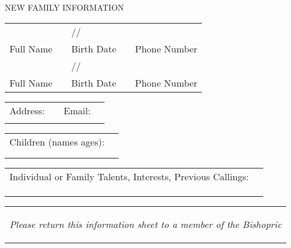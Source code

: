 \documentclass[11pt,twocolumn]{memoir}
\renewcommand\&{{\textnormal{\fontspec{Minion Pro}\itshape\amp}}}
\begin{document}
\thispagestyle{empty}

{\noindent\large\MakeUppercase{New Family Information}}

\renewcommand{\tabcolsep}{0in}
\noindent\begin{tabular}{>{\footnotesize}p{2in} p{0.1in} >{\footnotesize}p{1in} p{0.1in} >{\footnotesize}p{1.3in}}
    & & \hspace{2.5em}/\hspace{2.25em}/\\
    \hhline{-~-~-}
    Full Name & & Birth Date & & Phone Number\\
    & & \hspace{2.5em}/\hspace{2.25em}/\\
    \hhline{-~-~-}
    Full Name & & Birth Date & & Phone Number\\
\end{tabular}
\vspace{0.1em}
\begin{tabular}{>{\footnotesize}p{0.45in} >{\footnotesize}p{2.05in} >{\footnotesize}p{0.35in} >{\footnotesize}p{1.65in}}
    Address: & & Email: & \\
    \hhline{~-~-}
\end{tabular}
\vspace{0.1em}
\begin{tabular}{>{\footnotesize}p{1.3in} p{3.2in}}
    Children (names \& ages): & \\
    \hhline{~-}
    &\\[0.1em]
    \hhline{--}
\end{tabular}
\vspace{-1em}
\begin{tabular}{>{\footnotesize}p{3in} p{1.5in}}
    Individual or Family Talents, Interests, \& Previous Callings: & \\
    \hhline{~-}
    &\\[0.1em]
    \hhline{--}
    &\\[0.1em]
    \hhline{--}
\end{tabular}
\vspace{0em}
\begin{tabular}{>{\footnotesize}p{4.5in}}
    \begin{center}\emph{Please return this information sheet to a member of the Bishopric}\end{center}\\
\end{tabular}
\end{document}
